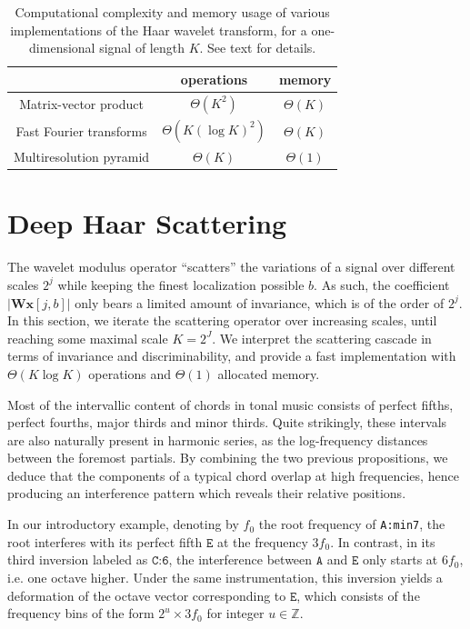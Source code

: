 \documentclass{article}
\makeatletter
\newcommand*{\ie}{i.e.\@\xspace}
\makeatother
\begin{document}
\begin{table}
	\begin{center}
	\begin{tabular}{|c|cc|}
		\hline
		& operations & memory \\
		\hline
		Matrix-vector product & $\Theta(K^2)$ & $\Theta(K)$ \\
		Fast Fourier transforms & $\Theta(K (\log K)^2)$ & $\Theta(K)$ \\
		Multiresolution pyramid & $\Theta(K)$ & $\Theta(1)$ \\
		\hline		
	\end{tabular}
	\end{center}
	\caption{
	Computational complexity and memory usage of various implementations
	of the Haar wavelet transform, for a one-dimensional signal of length $K$.
	See text for details.
	\label{table:wavelet-complexities}}
\end{table}


\section{Deep Haar Scattering}\label{sec:scattering}
The wavelet modulus operator ``scatters'' the variations of a signal over
different scales $2^j$ while keeping the finest localization possible $b$.
As such, the coefficient $\vert \mathbf{W} \boldsymbol{x}[j, b] \vert$
only bears a limited amount of invariance, which is of the order
of $2^j$.
In this section, we iterate the scattering operator over increasing scales,
until reaching some maximal scale $K=2^J$.
We interpret the scattering cascade in terms of invariance and discriminability,
and provide a fast implementation with $\Theta(K \log K)$ operations
and $\Theta(1)$ allocated memory.

Most of the intervallic content of chords in tonal music consists of perfect fifths,
perfect fourths, major thirds and minor thirds.
Quite strikingly, these intervals are also naturally present in harmonic series,
as the log-frequency distances between the foremost partials.
By combining the two previous propositions, we deduce that
the components of a typical chord overlap at high frequencies,
hence producing an interference pattern which reveals their relative positions.

In our introductory example, denoting by $f_0$ the root frequency of \texttt{A:min7},
the root interferes with its perfect fifth $\texttt{E}$ at the frequency $3 f_0$.
In contrast, in its third inversion labeled as $\texttt{C:6}$, the interference
between $\texttt{A}$ and $\texttt{E}$ only starts at $6 f_0$, \ie one octave higher.
Under the same instrumentation, this inversion yields a deformation of the
octave vector corresponding to $\texttt{E}$, which consists of the frequency bins
of the form $2^u \times 3 f_0$ for integer $u \in \mathbb{Z}$.
\end{document}
